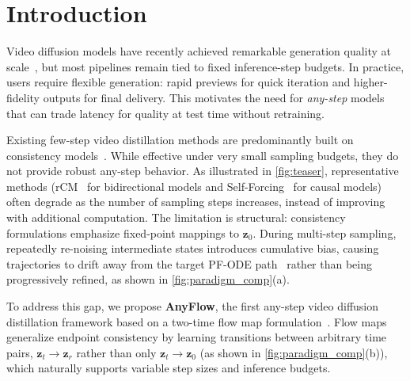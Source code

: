 \section{Introduction}
\label{sec:intro}

Video diffusion models have recently achieved remarkable generation quality at scale~\cite{wan2025wan,agarwal2025cosmos,kong2024hunyuanvideo,yang2024cogvideox,HaCohen2024LTXVideo}, but most pipelines remain tied to fixed inference-step budgets. In practice, users require flexible generation: rapid previews for quick iteration and higher-fidelity outputs for final delivery. This motivates the need for \emph{any-step} models that can trade latency for quality at test time without retraining.

Existing few-step video distillation methods are predominantly built on consistency models~\cite{song2023consistency,song2024improved,lu2024simplifying,zheng2025large,huang2025selfforcing}. While effective under very small sampling budgets, they do not provide robust any-step behavior. As illustrated in \cref{fig:teaser}, representative methods (\eg rCM~\cite{zheng2025large} for bidirectional models and Self-Forcing~\cite{huang2025selfforcing} for causal models) often degrade as the number of sampling steps increases, instead of improving with additional computation. The limitation is structural: consistency formulations emphasize fixed-point mappings to $\mathbf{z}_0$. During multi-step sampling, repeatedly re-noising intermediate states introduces cumulative bias, causing trajectories to drift away from the target PF-ODE path~\cite{sabour2025align} rather than being progressively refined, as shown in \cref{fig:paradigm_comp}(a).

To address this gap, we propose \textbf{AnyFlow}, the first any-step video diffusion distillation framework based on a two-time flow map formulation~\cite{boffi2024flow,sabour2025align,geng2025mean}. Flow maps generalize endpoint consistency by learning transitions between arbitrary time pairs, \ie $\mathbf{z}_t\!\to\!\mathbf{z}_r$ rather than only $\mathbf{z}_t\!\to\!\mathbf{z}_0$ (as shown in \cref{fig:paradigm_comp}(b)), which naturally supports variable step sizes and inference budgets.



